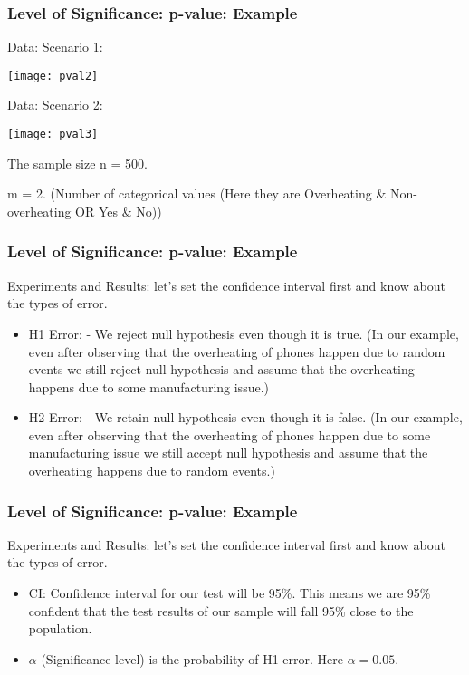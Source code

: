 \begin{frame}[fragile]\frametitle{Level of Significance: p-value: Example}
Data: Scenario 1:
\begin{center}
\texttt{[image: pval2]}
\end{center}

Data: Scenario 2:
\begin{center}
\texttt{[image: pval3]}
\end{center}

The sample size n = 500.

m = 2. (Number of categorical values (Here they are Overheating \& Non-overheating OR Yes \& No))


\end{frame}

\begin{frame}[fragile]\frametitle{Level of Significance: p-value: Example}
Experiments and Results: let’s set the confidence interval first and know about the types of error.

\begin{itemize}
\item H1 Error: - We reject null hypothesis even though it is true. (In our example, even after observing that the overheating of phones happen due to random events we still reject null hypothesis and assume that the overheating happens due to some manufacturing issue.)

\item H2 Error: - We retain null hypothesis even though it is false. (In our example, even after observing that the overheating of phones happen due to some manufacturing issue we still accept null hypothesis and assume that the overheating happens due to random events.)

\end{itemize}

\end{frame}

\begin{frame}[fragile]\frametitle{Level of Significance: p-value: Example}
Experiments and Results: let’s set the confidence interval first and know about the types of error.

\begin{itemize}

\item CI: Confidence interval for our test will be 95\%. This means we are 95\% confident that the test results of our sample will fall 95\% close to the population.

\item $\alpha$ (Significance level) is the probability of H1 error. Here $\alpha = 0.05$.
\end{itemize}

\end{frame}

